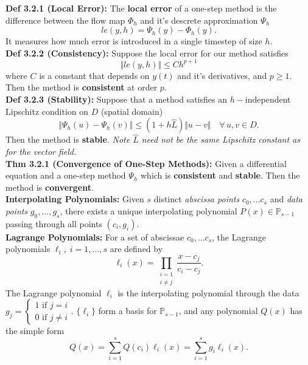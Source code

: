 \documentclass[10pt,a4paper]{article}
\renewcommand{\P}{\mathbb{P}}
\newcommand{\norm}[1]{\Vert #1 \Vert}
\begin{document}
\begin{multicols*}{2}
\textbf{Def 3.2.1 (Local Error):} The \textbf{local error} of a one-step method is the difference between the flow map $\Phi_h$ and it's descrete approximation $\Psi_h$ 
\[ le(y, h) = \Psi_h(y) - \Phi_h(y).\]
It measures how much error is introduced in a single timestep of size $h$.\\

\textbf{Def 3.2.2 (Consistency):} Suppose the local error for our method satisfies 
\[ \Vert le(y, h) \Vert \leq Ch^{p + 1} \]
 where $C$ is a constant that depends on $y(t)$ and it's derivatives, and $p \geq 1$. Then the method is \textbf{consistent} at order $p$.\\

\textbf{Def 3.2.3 (Stability):} Suppose that a method satisfies an $h-$independent Lipschitz condition on $D$ (spatial domain)
 \[ \norm{\Psi_h(u) - \Psi_h(v)} \leq (1 + h\hat L)\norm{u - v} \quad \forall\, u, v \in D. \]
 Then the method is \textbf{stable}. \textit{Note $\hat L$ need not be the same Lipschitz constant as for the vector field.}\\

\textbf{Thm 3.2.1 (Convergence of One-Step Methods):} Given a differential equation and a one-step method $\Psi_h$ which is \textbf{consistent} and \textbf{stable}. Then the method is \textbf{convergent}.\\

\textbf{Interpolating Polynomials:} Given $s$ distinct \textit{abscissa points} $c_0, ... c_s$ and \textit{data points} $g_0, ..., g_s$, there exists a unique interpolating polynomial $P(x) \in \P_{s - 1}$ passing through all points $(c_i, g_i)$.\\

\textbf{Lagrange Polynomials:} For a set of abscissae $c_0, ... c_s$, the Lagrange polynomials $\ell_i, \; i = 1,...,s$ are defined by \[
\ell_i(x) = \prod_{\begin{smallmatrix}i = 1 \\ i \neq j\end{smallmatrix}} \frac{x - c_j}{c_i - c_j}.
\]
The Lagrange polynomial $\ell_i$ is the interpolating polynomial through the data $g_j = \begin{cases*} 1 \text{ if } j = i \\ 0 \text{ if } j \neq i \end{cases*}$. $\{\ell_i\}$ form a basis for $\P_{s - 1}$, and any polynomial $Q(x)$ has the simple form \[
Q(x) = \sum_{i=1}^s Q(c_i) \ell_i(x) =  \sum_{i=1}^s g_i \ell_i(x) .   
\]


\end{multicols*}
\end{document}
